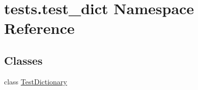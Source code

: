 \hypertarget{namespacetests_1_1test__dict}{}\section{tests.\+test\+\_\+dict Namespace Reference}
\label{namespacetests_1_1test__dict}
\subsection*{Classes}
\begin{DoxyCompactItemize}
\item 
class \hyperlink{classtests_1_1test__dict_1_1TestDictionary}{Test\+Dictionary}
\end{DoxyCompactItemize}

